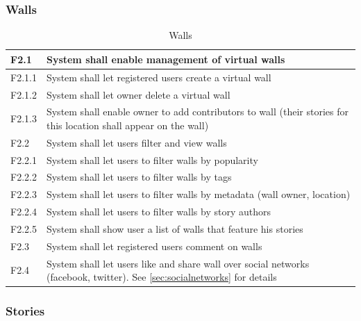 \documentclass[11pt]{book}
\begin{document}
\subsubsection{Walls}

\begin{table}[H]
\centering
\begin{tabular}{ l  p{11cm} }
F2.1 & System shall enable management of virtual walls\\
\hline
F2.1.1 & System shall let registered users create a virtual wall\\
\hline
F2.1.2 & System shall let owner delete a virtual wall\\
\hline
F2.1.3 & System shall enable owner to add contributors to wall (their stories for this location shall appear on the wall)\\
\hline
F2.2 & System shall let users filter and view walls\\
\hline
F2.2.1 & System shall let users to filter walls by popularity\\
\hline
F2.2.2 & System shall let users to filter walls by tags\\
\hline
F2.2.3 & System shall let users to filter walls by metadata (wall owner, location)\\
\hline
F2.2.4 & System shall let users to filter walls by story authors\\
\hline
F2.2.5 & System shall show user a list of walls that feature his stories\\
\hline
F2.3 & System shall let registered users comment on walls\\
\hline
F2.4 & System shall let users like and share wall over social networks (facebook, twitter). See \ref{sec:socialnetworks} for details

\end{tabular}
\label{tab:requirements_walls}
\caption{Walls}
\end{table}

\subsubsection{Stories}
\end{document}
